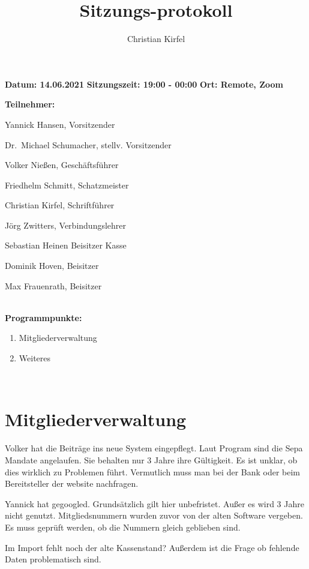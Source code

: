\documentclass[a4paper, 11pt]{article}
\title{Sitzungs-protokoll}
\author{Christian Kirfel}
\begin{document}
\pagestyle{style1}

\textbf{Datum: 14.06.2021} %
\textbf{Sitzungszeit: 19:00 - 00:00}
\textbf{Ort: Remote, Zoom} %

\textbf{Teilnehmer:} %
\begin{description}
\item Yannick Hansen, Vorsitzender
\item Dr.~Michael Schumacher, stellv. Vorsitzender
\item Volker Nießen, Geschäftsführer
\item Friedhelm Schmitt, Schatzmeister
\item Christian Kirfel, Schriftführer
\item Jörg Zwitters, Verbindungslehrer
\item Sebastian Heinen Beisitzer Kasse
\item Dominik Hoven, Beisitzer
\item Max Frauenrath, Beisitzer
\end{description}

\makebox[\linewidth]{\rule{\linewidth}{0.4pt}}\\
\textbf{Programmpunkte:} 
\begin{enumerate}
\item Mitgliederverwaltung
\item Weiteres
\end{enumerate}
\makebox[\linewidth]{\rule{\linewidth}{0.4pt}}\\

\newpage

\section*{Mitgliederverwaltung}

Volker hat die Beiträge ins neue System eingepflegt.
Laut Program sind die Sepa Mandate angelaufen. Sie behalten nur 3 Jahre ihre Gültigkeit.
Es ist unklar, ob dies wirklich zu Problemen führt.
Vermutlich muss man bei der Bank oder beim Bereitsteller der website nachfragen.

Yannick hat gegoogled.
Grundsätzlich gilt hier unbefristet. Außer es wird 3 Jahre nicht genutzt.
Mitgliedsnummern wurden zuvor von der alten Software vergeben.
Es muss geprüft werden, ob die Nummern gleich geblieben sind.

Im Import fehlt noch der alte Kassenstand?
Außerdem ist die Frage ob fehlende Daten problematisch sind.
\end{document}
